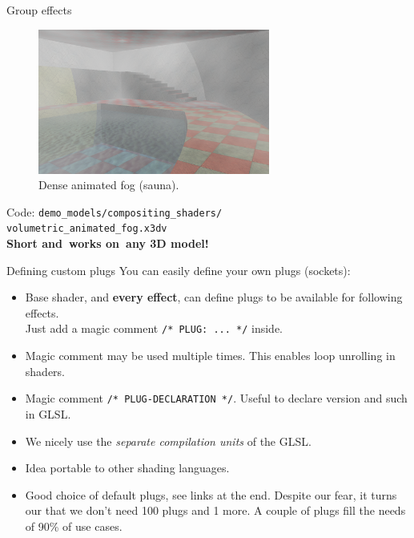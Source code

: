 \documentclass{beamer}
\begin{document}
\begin{frame}{Group effects}

\begin{figure}
  \centering
  \includegraphics[width=3in]{../volumetric_animated_fog_all}
  \caption{Dense animated fog (sauna).}
\end{figure}

Code: \texttt{demo\_models/compositing\_shaders/\\volumetric\_animated\_fog.x3dv}\\
\textbf{Short and~works on~any 3D model!}


\end{frame}

\begin{frame}{Defining custom plugs}
You can easily define your own plugs (sockets):
\begin{itemize}
  \item Base shader, and \textbf{every effect}, can define plugs
    to be available for following effects.\\
    Just add a magic comment \texttt{/* PLUG: ... */} inside.
  \item Magic comment may be used multiple times. This enables loop
    unrolling in shaders.
  \item Magic comment \texttt{/* PLUG-DECLARATION */}.
    Useful to declare version and such in GLSL.
  \item We nicely use the \textit{separate compilation units} of the GLSL.
  \item Idea portable to other shading languages.
  \item Good choice of default plugs, see links at the end.
    Despite our fear, it turns our that we don't need 100 plugs
    and 1 more. A couple of plugs fill the needs of 90\% of use cases.
\end{itemize}
\end{frame}
\end{document}
